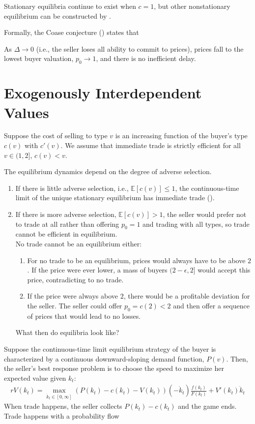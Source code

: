\documentclass[11pt]{elegantbook}
\begin{document}
Stationary equilibria continue to exist when $c = 1$, but other nonstationary equilibrium can be constructed by \cite{ausubel1989reputation}.

Formally, the Coase conjecture (\cite{coase1972durability}) states that
\begin{proposition}
    As $\Delta \rightarrow 0$ (i.e., the seller loses all ability to commit to prices), prices fall to the lowest buyer valuation, $p_0 \rightarrow 1$, and there is no inefficient delay.
\end{proposition}


\section{Exogenously Interdependent Values}
Suppose the cost of selling to type $v$ is an increasing function of the buyer's type $c(v)$ with $c'(v)$. We assume that immediate trade is strictly efficient for all $v\in (1,2]$, $c(v)<v$.

The equilibrium dynamics depend on the degree of adverse selection.
\begin{enumerate}
    \item If there is little adverse selection, i.e., $\mathbb{E}[c(v)]\leq 1$, the continuous-time limit of the unique stationary equilibrium has immediate trade (\cite{deneckere2006bargaining}).
    \item If there is more adverse selection, $\mathbb{E}[c(v)]>1$, the seller would prefer not to trade at all rather than offering $p_0=1$ and trading with all types, so trade cannot be efficient in equilibrium.\\
    No trade cannot be an equilibrium either:
    \begin{enumerate}
        \item For no trade to be an equilibrium, prices would always have to be above $2$. If the price were ever lower, a mass of buyers $(2-\epsilon,2]$ would accept this price, contradicting to no trade.
        \item If the price were always above $2$, there would be a profitable deviation for the seller. The seller could offer $p_0 = c(2) < 2$ and then offer a sequence of prices that would lead to no losses.
    \end{enumerate}
    What then do equilibria look like?
\end{enumerate}
Suppose the continuous-time limit equilibrium strategy of the buyer is characterized by a continuous downward-sloping demand function, $P(v)$. Then, the seller's best response problem is to choose the speed to maximize her expected value given $k_t$:
\begin{equation}
    \begin{aligned}
        r V(k_t) = \max_{\dot{k}_t\in[0,\infty]}\left(P(k_t)-c(k_t)-V(k_t)\right)(-\dot{k}_t)\frac{f(k_t)}{F(k_t)}+V'(k_t)\dot{k}_t
    \end{aligned}
    \nonumber
\end{equation}
When trade happens, the seller collects $P(k_t)-c(k_t)$ and the game ends. Trade happens with a probability flow
\end{document}
